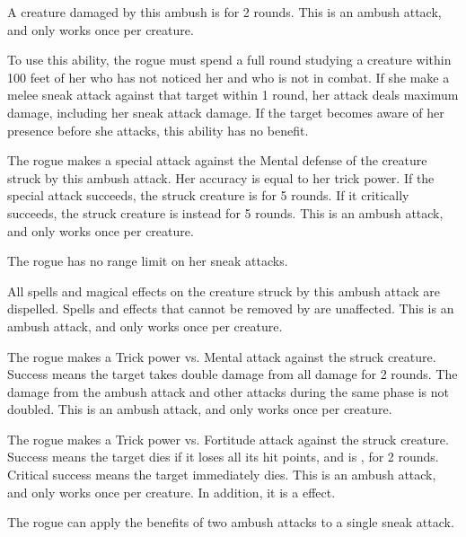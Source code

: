        A creature damaged by this ambush is \immobilized for 2 rounds.
        This is an ambush attack, and only works once per creature.

        To use this ability, the rogue must spend a full round studying a creature within 100 feet of her who has not noticed her and who is not in combat.
        If she make a melee sneak attack against that target within 1 round, her attack deals maximum damage, including her sneak attack damage.
        If the target becomes aware of her presence before she attacks, this ability has no benefit.

        The rogue makes a special attack against the Mental defense of the creature struck by this ambush attack.
        Her accuracy is equal to her trick power.
        If the special attack succeeds, the struck creature is \disoriented for 5 rounds.
        If it critically succeeds, the struck creature is instead \confused for 5 rounds.
        This is an ambush attack, and only works once per creature.

        The rogue has no range limit on her sneak attacks.

        All spells and magical effects on the creature struck by this ambush attack are dispelled.
        Spells and effects that cannot be removed by  are unaffected.
        This is an ambush attack, and only works once per creature.

        The rogue makes a Trick power vs. Mental attack against the struck creature.
        Success means the target takes double damage from all damage for 2 rounds.
        The damage from the ambush attack and other attacks during the same phase is not doubled.
        This is an ambush attack, and only works once per creature.

        The rogue makes a Trick power vs. Fortitude attack against the struck creature.
        Success means the target dies if it loses all its hit points, and is \staggered, for 2 rounds.
        Critical success means the target immediately dies.
        This is an ambush attack, and only works once per creature.
        In addition, it is a  effect.

        The rogue can apply the benefits of two ambush attacks to a single sneak attack.

